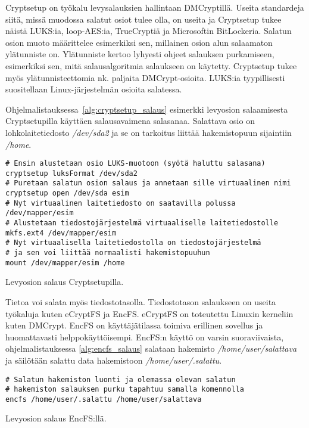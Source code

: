 Cryptsetup on työkalu levysalauksien hallintaan DMCryptillä. Useita standardeja siitä, missä muodossa salatut osiot tulee olla, on useita ja Cryptsetup tukee näistä LUKS:ia, loop-AES:ia, TrueCryptiä ja Microsoftin BitLockeria. Salatun osion muoto määrittelee esimerkiksi sen, millainen osion alun salaamaton ylätunniste on. Ylätunniste kertoo lyhyesti ohjeet salauksen purkamiseen, esimerkiksi sen, mitä salausalgoritmia salaukseen on käytetty. Cryptsetup tukee myös ylätunnisteettomia nk. paljaita DMCrypt-osioita. LUKS:ia tyypillisesti suositellaan Linux-järjestelmän osioita salatessa.

Ohjelmalistauksessa~\ref{alg:cryptsetup_salaus} esimerkki levyosion salaamisesta Cryptsetupilla käyttäen salausavaimena salasanaa. Salattava osio on lohkolaitetiedosto \textit{/dev/sda2} ja se on tarkoitus liittää hakemistopuun sijaintiin \textit{/home}.~\cite{cryptsetup}

\begin{algorithm}[tbh]
\begin{verbatim}
# Ensin alustetaan osio LUKS-muotoon (syötä haluttu salasana)
cryptsetup luksFormat /dev/sda2
# Puretaan salatun osion salaus ja annetaan sille virtuaalinen nimi
cryptsetup open /dev/sda esim
# Nyt virtuaalinen laitetiedosto on saatavilla polussa /dev/mapper/esim
# Alustetaan tiedostojärjestelmä virtuaaliselle laitetiedostolle
mkfs.ext4 /dev/mapper/esim
# Nyt virtuaalisella laitetiedostolla on tiedostojärjestelmä
# ja sen voi liittää normaalisti hakemistopuuhun
mount /dev/mapper/esim /home
\end{verbatim}
\caption{Levyosion salaus Cryptsetupilla.\label{alg:cryptsetup_salaus}}
\end{algorithm}
\newpage{}

Tietoa voi salata myös tiedostotasolla. Tiedostotason salaukseen on useita työkaluja kuten eCryptFS ja EncFS. eCryptFS on toteutettu Linuxin kerneliin kuten DMCrypt. EncFS on käyttäjätilassa toimiva erillinen sovellus ja huomattavasti helppokäyttöisempi. EncFS:n käyttö on varsin suoraviivaista, ohjelmalistauksessa \ref{alg:encfs_salaus} salataan hakemisto \textit{/home/user/salattava} ja säilötään salattu data hakemistoon \textit{/home/user/.salattu}.~\cite{encfs}

\begin{algorithm}[tbh]
\begin{verbatim}
# Salatun hakemiston luonti ja olemassa olevan salatun
# hakemiston salauksen purku tapahtuu samalla komennolla
encfs /home/user/.salattu /home/user/salattava
\end{verbatim}
\caption{Levyosion salaus EncFS:llä.\label{alg:encfs_salaus}}
\end{algorithm}
\newpage{}

